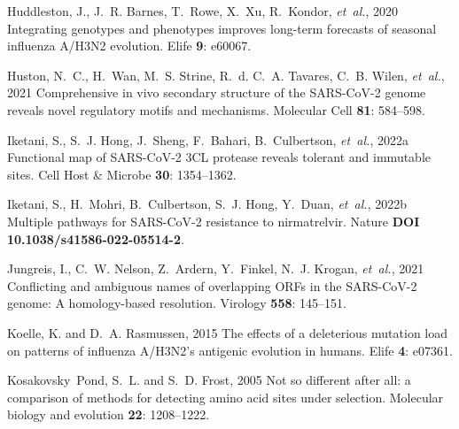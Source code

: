 \documentclass[9pt,twocolumn,twoside]{gsajnl_modified}
\begin{document}
{\begin{thebibliography}{76}
{Huddleston, J., J.~R. Barnes, T.~Rowe, X.~Xu, R.~Kondor, {\em et~al.\/}}, 2020
  Integrating genotypes and phenotypes improves long-term forecasts of seasonal
  influenza {A/H3N2} evolution. Elife {\bf 9}: e60067.

{Huston, N.~C., H.~Wan, M.~S. Strine, R.~d. C.~A. Tavares, C.~B. Wilen, {\em
  et~al.\/}}, 2021 Comprehensive in vivo secondary structure of the
  {SARS-CoV-2} genome reveals novel regulatory motifs and mechanisms. Molecular
  Cell {\bf 81}: 584--598.

{Iketani, S., S.~J. Hong, J.~Sheng, F.~Bahari, B.~Culbertson, {\em et~al.\/}},
  2022{a} {Functional map of SARS-CoV-2 3CL protease reveals tolerant and
  immutable sites}. Cell Host \& Microbe {\bf 30}: 1354--1362.

{Iketani, S., H.~Mohri, B.~Culbertson, S.~J. Hong, Y.~Duan, {\em et~al.\/}},
  2022{b} Multiple pathways for {SARS-CoV-2} resistance to nirmatrelvir. Nature
  {\bf DOI 10.1038/s41586-022-05514-2}.

{Jungreis, I., C.~W. Nelson, Z.~Ardern, Y.~Finkel, N.~J. Krogan, {\em
  et~al.\/}}, 2021 {Conflicting and ambiguous names of overlapping ORFs in the
  SARS-CoV-2 genome: A homology-based resolution}. Virology {\bf 558}:
  145--151.

{Koelle, K. {\rm and} D.~A. Rasmussen}, 2015 The effects of a deleterious
  mutation load on patterns of influenza {A/H3N2's} antigenic evolution in
  humans. Elife {\bf 4}: e07361.

{Kosakovsky~Pond, S.~L. {\rm and} S.~D. Frost}, 2005 Not so different after
  all: a comparison of methods for detecting amino acid sites under selection.
  Molecular biology and evolution {\bf 22}: 1208--1222.


\end{thebibliography}}
\end{document}
